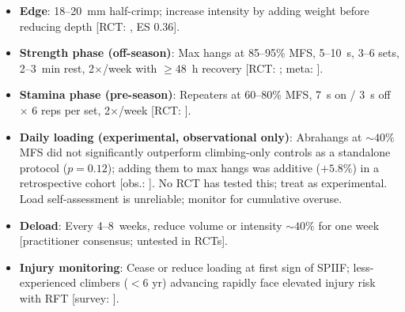 \begin{itemize}[noitemsep, topsep=2pt]
  \item \textbf{Edge}: 18--20~mm half-crimp; increase intensity by adding weight before reducing depth \textnormal{[RCT: \cite{MSAE21}, ES 0.36]}.
  \item \textbf{Strength phase (off-season)}: Max hangs at 85--95\% MFS, 5--10~s, 3--6 sets, 2--3~min rest, 2$\times$/week with $\geq48$~h recovery \textnormal{[RCT: \cite{O19, MSAE21}; meta: \cite{SO23}]}.
  \item \textbf{Stamina phase (pre-season)}: Repeaters at 60--80\% MFS, 7~s on / 3~s off $\times$ 6 reps per set, 2$\times$/week \textnormal{[RCT: \cite{HO22, DO22}]}.
  \item \textbf{Daily loading (experimental, observational only)}: Abrahangs at ${\sim}40\%$ MFS did not significantly outperform climbing-only controls as a standalone protocol ($p = 0.12$); adding them to max hangs was additive ($+5.8\%$) in a retrospective cohort \textnormal{[obs.: \cite{GKAO24}]}. No RCT has tested this; treat as experimental. Load self-assessment is unreliable; monitor for cumulative overuse.
  \item \textbf{Deload}: Every 4--8~weeks, reduce volume or intensity ${\sim}40\%$ for one week \textnormal{[practitioner consensus; untested in RCTs]}.
  \item \textbf{Injury monitoring}: Cease or reduce loading at first sign of SPIIF; less-experienced climbers ($<6$ yr) advancing rapidly face elevated injury risk with RFT \textnormal{[survey: \cite{O23}]}.
\end{itemize}
